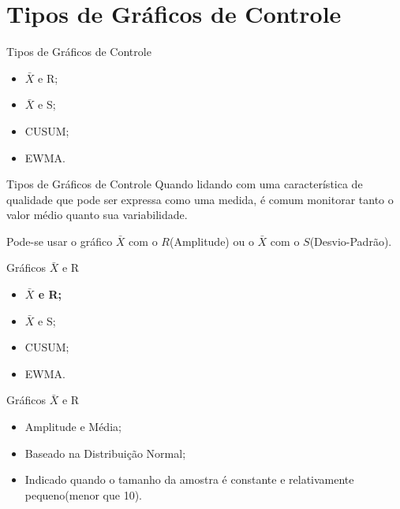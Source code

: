 \documentclass[12pt]{beamer}
\begin{document}
%

  \section{Tipos de Gráficos de Controle}

  \begin{frame}[t]{Tipos de Gráficos de Controle}
    \begin{itemize}
      \item $\bar X$ e R;

      \item $\bar X$ e S;

      \item CUSUM;

      \item EWMA.
    \end{itemize}
  \end{frame}

  \begin{frame}[t]{Tipos de Gráficos de Controle}
    Quando lidando com uma característica de qualidade que pode ser expressa como uma medida, é comum monitorar tanto o valor médio quanto sua variabilidade.\newline

    Pode-se usar o gráfico $\bar X$ com o $R$(Amplitude) ou o $\bar X$ com o $S$(Desvio-Padrão).
  \end{frame}


  \begin{frame}[t]{Gráficos $\bar X$ e R}
    \begin{itemize}
      \item \textbf{$\bar X$ e R;}

      \item $\bar X$ e S;

      \item CUSUM;

      \item EWMA.
    \end{itemize}
  \end{frame}

  \begin{frame}[t]{Gráficos $\bar X$ e R}
    \begin{itemize}
      \item Amplitude e Média;

      \item Baseado na Distribuição Normal;

      \item Indicado quando o tamanho da amostra é constante e relativamente pequeno(menor que 10).
    \end{itemize}
  \end{frame}
\end{document}

